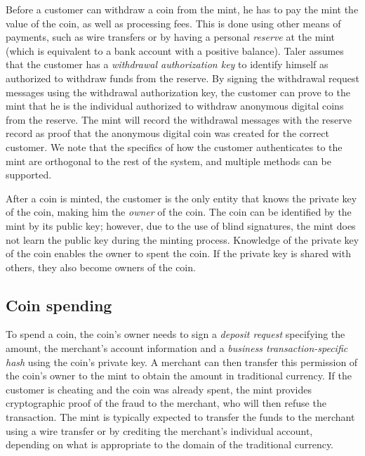 \documentclass{llncs}
\begin{document}
Before a customer can withdraw a coin from the mint, he has to pay the
mint the value of the coin, as well as processing fees.  This is done
using other means of payments, such as wire transfers or
by having a personal {\em reserve} at the mint (which is equivalent to
a bank account with a positive balance).  Taler assumes that the
customer has a {\em withdrawal authorization key} to identify himself
as authorized to withdraw funds from the reserve.  By signing the
withdrawal request messages using the withdrawal authorization key,
the customer can prove to the mint that he is the individual
authorized to withdraw anonymous digital coins from the reserve.  The
mint will record the withdrawal messages with the reserve record as
proof that the anonymous digital coin was created for the correct
customer.  We note that the specifics of how the customer
authenticates to the mint are orthogonal to the rest of the system,
and multiple methods can be supported.

After a coin is minted, the customer is the only entity that knows the
private key of the coin, making him the \emph{owner} of the coin.  The
coin can be identified by the mint by its public key; however, due to
the use of blind signatures, the mint does not learn the public key
during the minting process.  Knowledge of the private key of the coin
enables the owner to spent the coin.  If the private key is shared
with others, they also become owners of the coin.

\subsection{Coin spending}

To spend a coin, the coin's owner needs to sign a {\em deposit
  request} specifying the amount, the merchant's account information
and a {\em business transaction-specific hash} using the coin's
private key.  A merchant can then transfer this permission of the
coin's owner to the mint to obtain the amount in traditional currency.
If the customer is cheating and the coin was already spent, the mint
provides cryptographic proof of the fraud to the merchant, who will
then refuse the transaction.  The mint is typically expected to
transfer the funds to the merchant using a wire transfer or by
crediting the merchant's individual account, depending on what is
appropriate to the domain of the traditional currency.
\end{document}
